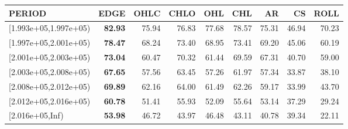 \begin{table}[ht]
\centering
\begin{tabular}{lrrrrrrrr}
  \hline
PERIOD & EDGE & OHLC & CHLO & OHL & CHL & AR & CS & ROLL \\ 
  \hline
[1.993e+05,1.997e+05) & \textbf{82.93} & 75.94 & 76.83 & 77.68 & 78.57 & 75.31 & 46.94 & 70.23 \\ 
  [1.997e+05,2.001e+05) & \textbf{78.47} & 68.24 & 73.40 & 68.95 & 73.41 & 69.20 & 45.06 & 60.19 \\ 
  [2.001e+05,2.003e+05) & \textbf{73.04} & 60.47 & 70.32 & 61.44 & 69.59 & 67.31 & 40.70 & 59.00 \\ 
  [2.003e+05,2.008e+05) & \textbf{67.65} & 57.56 & 63.45 & 57.26 & 61.97 & 57.34 & 33.87 & 38.10 \\ 
  [2.008e+05,2.012e+05) & \textbf{69.89} & 62.16 & 64.00 & 61.49 & 62.26 & 59.17 & 33.99 & 43.70 \\ 
  [2.012e+05,2.016e+05) & \textbf{60.78} & 51.41 & 55.93 & 52.09 & 55.64 & 53.14 & 37.29 & 29.24 \\ 
  [2.016e+05,Inf) & \textbf{53.98} & 46.72 & 43.97 & 46.48 & 43.11 & 40.78 & 39.34 & 22.11 \\ 
   \hline
\end{tabular}
\end{table}
